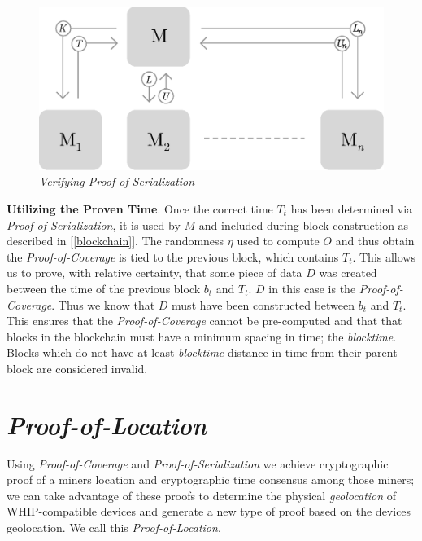 \documentclass[UTF8, 10pt, nonatbib, nocopyrightspace, reprint]{sigplanconf}
\newcommand{\secref}[1]{[\autoref{#1}]}
\begin{document}
\begin{figure}[ht]
    \begin{center}
          \includegraphics[width=\columnwidth]{verify_serialization.eps}
          \caption{\emph{Verifying Proof-of-Serialization}}
          \label{fig:verify-serialization}
     \end{center}
\end{figure}

\textbf{Utilizing the Proven Time}. Once the correct time $T_t$ has been determined via \emph{Proof-of-Serialization}, it is used by $M$ and included during block construction as described in \secref{blockchain}. The randomness $\eta$ used to compute $O$ and thus obtain the \emph{Proof-of-Coverage} is tied to the previous block, which contains $T_t$. This allows us to prove, with relative certainty, that some piece of data $D$ was created between the time of the previous block $b_t$ and $T_t$. $D$ in this case is the \emph{Proof-of-Coverage}. Thus we know that $D$ must have been constructed between $b_t$ and $T_t$. This ensures that the \emph{Proof-of-Coverage} cannot be pre-computed and that that blocks in the blockchain must have a minimum spacing in time; the \emph{blocktime}. Blocks which do not have at least \emph{blocktime} distance in time from their parent block are considered invalid.

\section{\emph{Proof-of-Location}} \label{geolocation}

Using \emph{Proof-of-Coverage} and \emph{Proof-of-Serialization} we achieve cryptographic proof of a miners location and cryptographic time consensus among those miners; we can take advantage of these proofs to determine the physical \emph{geolocation} of WHIP-compatible devices and generate a new type of proof based on the devices geolocation. We call this \emph{Proof-of-Location}.
\end{document}
